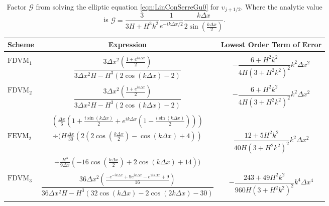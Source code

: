 \begin{table}
	\centering   
	\begin{tabular}{l  c  c}
		Scheme& Expression& Lowest Order Term of Error\\
		\hline && \\
		$\text{FDVM}_1$& $\dfrac{3 \Delta x^2 \left(\frac{1 + e^{ik\Delta x}}{2}\right)}{3 \Delta x^2 H - H^3 \left(2\cos\left(k\Delta x\right) - 2\right)}$ & $-\dfrac{6 +H^2k^2}{4H \left(3 + H^2k^2\right)^2}k^2 \Delta x^2$ \\ & & \\
		$\text{FDVM}_2$& $\dfrac{3 \Delta x^2 \left(\frac{1 + e^{ik\Delta x}}{2}\right)}{3 \Delta x^2 H - H^3 \left(2\cos\left(k\Delta x\right) - 2\right)}$ & $-\dfrac{6 +H^2k^2}{4H \left(3 + H^2k^2\right)^2}k^2 \Delta x^2$ \\ & & \\
		& $\left(\frac{\Delta x}{6} \left(1 + \frac{i \sin\left(k \Delta x\right)}{2} + e^{ik\Delta x}\left(1 - \frac{i \sin\left(k \Delta x\right)}{2}\right) \right)\right)$ & \\  $\text{FEVM}_2$ & $\div  \Bigg(H\frac{\Delta x}{30} \left( 2\left(2\cos\left(\frac{k \Delta x}{2}\right) - \cos\left({k \Delta x}\right) + 4\right)  \right)$  & $\dfrac{12 + 5H^2k^2}{40H \left(3 + H^2k^2\right)^2}k^2 \Delta x^2$ \\ &$+ \frac{H^3 }{9\Delta x}\left(-16\cos\left(\frac{k\Delta x}{2}\right) + 2 \cos\left(k \Delta x\right) + 14\right)    \Bigg)$ & \\ & & \\
		$\text{FDVM}_3$&  $\dfrac{36 \Delta x^2 \left(\frac{-e^{-ik\Delta x} + 9e^{ik\Delta x} - e^{2ik\Delta x} + 9}{16}\right)}{36 \Delta x^2H - H^3\left(32\cos\left(k \Delta x\right) -2\cos\left(2k \Delta x\right) - 30\right)}$ & $-\dfrac{243 + 49H^2k^2}{960H\left(3 + H^2k^2\right)^2}k^4 \Delta x^4$ \\ & & \\ 
	\end{tabular}
	\caption{Factor $\mathcal{G}$ from solving the elliptic equation \eqref{eqn:LinConSerreGu0} for $\upsilon_{j+1/2}$. Where the analytic value is  $\mathcal{G} = \dfrac{3}{3H + H^3k^2} \dfrac{1}{e^{-ik\Delta x/2}} \dfrac{k\Delta x}{2 \sin\left(\frac{k \Delta x}{2}\right)}$.}
	\label{tab:Gfactor} 
\end{table}

